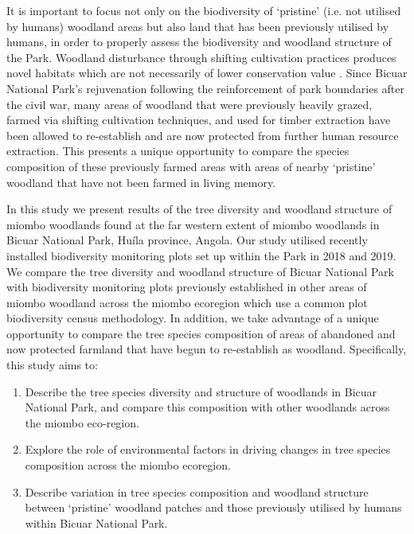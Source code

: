 \begin{refsection}
It is important to focus not only on the biodiversity of `pristine' (i.e. not utilised by humans) woodland areas but also land that has been previously utilised by humans, in order to properly assess the biodiversity and woodland structure of the Park. Woodland disturbance through shifting cultivation practices produces novel habitats which are not necessarily of lower conservation value \citep{McNicol2015a, Goncalves2017}. Since Bicuar National Park's rejuvenation following the reinforcement of park boundaries after the civil war, many areas of woodland that were previously heavily grazed, farmed via shifting cultivation techniques, and used for timber extraction have been allowed to re-establish and are now protected from further human resource extraction. This presents a unique opportunity to compare the species composition of these previously farmed areas with areas of nearby `pristine' woodland that have not been farmed in living memory.

In this study we present results of the tree diversity and woodland structure of miombo woodlands found at the far western extent of miombo woodlands in Bicuar National Park, Hu\'{i}la province, Angola. Our study utilised recently installed biodiversity monitoring plots set up within the Park in 2018 and 2019. We compare the tree diversity and woodland structure of Bicuar National Park with biodiversity monitoring plots previously established in other areas of miombo woodland across the miombo ecoregion which use a common plot biodiversity census methodology. In addition, we take advantage of a unique opportunity to compare the tree species composition of areas of abandoned and now protected farmland that have begun to re-establish as woodland. Specifically, this study aims to:

\begin{enumerate}
\item{Describe the tree species diversity and structure of woodlands in Bicuar National Park, and compare this composition with other woodlands across the miombo eco-region.}
\item{Explore the role of environmental factors in driving changes in tree species composition across the miombo ecoregion.}
\item{Describe variation in tree species composition and woodland structure between `pristine' woodland patches and those previously utilised by humans within Bicuar National Park.}
\end{enumerate}


\end{refsection}
